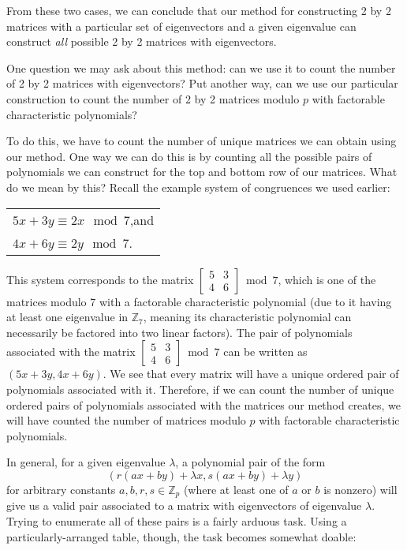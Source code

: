 \documentclass[a4paper, 12pt, reqno]{amsart}
\newcommand{\Z}{\mathbb{Z}}
\newcommand\smallmat[1]{\left[\begin{smallmatrix}#1\end{smallmatrix}\right]}
\begin{document}
	From these two cases, we can conclude that our method for constructing 2 by 2 matrices with a particular set of eigenvectors and a given eigenvalue can construct 
	\emph{all} possible 2 by 2 matrices with eigenvectors.
	
	One question we may ask about this method: can we use it to count the number of 2 by 2 matrices with eigenvectors? Put another way, can we use our particular construction 
	to count the number of 2 by 2 matrices modulo $p$ with factorable characteristic polynomials?
	
	To do this, we have to count the number of unique matrices we can obtain using our method. One way we can do this is by counting all the possible pairs of polynomials
	we can construct for the top and bottom row of our matrices. What do we mean by this? Recall the example system of congruences we used earlier:
	\begin{center}
		\begin{tabular}{l}
			$5x + 3y \equiv 2x \mod{7}$,\quad and \\
			$4x + 6y \equiv 2y \mod{7}$.
		\end{tabular}
	\end{center}
	This system corresponds to the matrix $\smallmat{5&3\\4&6} \bmod{7}$, which is one of the matrices modulo 7 with a factorable characteristic polynomial (due to it having 
	at least one eigenvalue in $\Z_7$, meaning its characteristic polynomial can necessarily be factored into two linear factors). The pair of polynomials associated with the
	matrix $\smallmat{5&3\\4&6} \bmod{7}$ can be written as $(5x+3y, 4x+6y)$. We see that every matrix will have a unique ordered pair of polynomials associated with it.
	Therefore, if we can count the number of unique ordered pairs of polynomials associated with the matrices our method creates, we will have counted the number of matrices 
	modulo $p$ with factorable characteristic polynomials.
	
	In general, for a given eigenvalue $\lambda$, a polynomial pair of the form 
	\[
		(r(ax + by) + \lambda x, s(ax + by) + \lambda y)
	\]
	for arbitrary constants $a,b,r,s \in \Z_p$ (where at least one of $a$ or $b$ is nonzero) will give us a valid pair associated to a matrix with eigenvectors of eigenvalue 
	$\lambda$. Trying to enumerate all of these pairs is a fairly arduous task. Using a particularly-arranged table, though, the task becomes somewhat doable:
	
\end{document}
